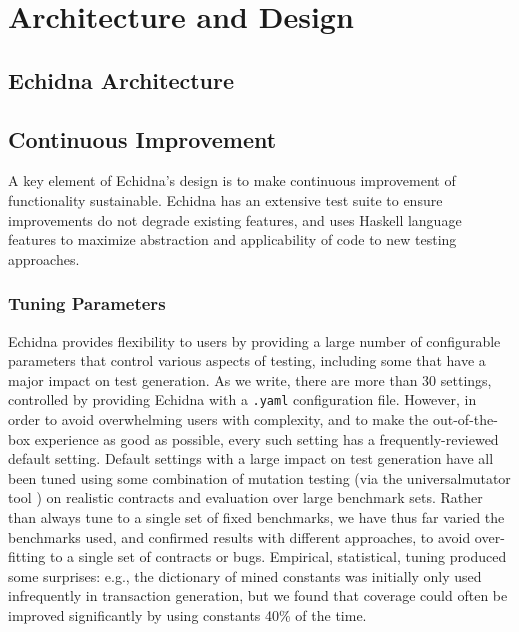 \section{Architecture and Design}

\subsection{Echidna Architecture}

\subsection{Continuous Improvement}

A key element of Echidna's design is to make continuous improvement of functionality sustainable.  Echidna has an extensive test suite to ensure improvements do not degrade existing features, and uses Haskell language features to maximize abstraction and applicability of code to new testing approaches.

\subsubsection{Tuning Parameters}

Echidna provides flexibility to users by providing a large number of configurable parameters that control various aspects of testing, including some that have a major impact on test generation.  As we write, there are more than 30 settings, controlled by providing Echidna with a {\tt .yaml} configuration file.  However, in order to avoid overwhelming users with complexity, and to make the out-of-the-box experience as good as possible, every such setting has a frequently-reviewed default setting.  Default settings with a large impact on test generation have all been tuned using some combination of mutation testing (via the universalmutator tool \cite{regexpMut}) on realistic contracts and evaluation over large benchmark sets.  Rather than always tune to a single set of fixed benchmarks, we have thus far varied the benchmarks used, and confirmed results with different approaches, to avoid over-fitting to a single set of contracts or bugs.  Empirical, statistical, tuning produced some surprises:  e.g., the dictionary of mined constants was initially only used infrequently in transaction generation, but we found that coverage could often be improved significantly by using constants 40\% of the time.